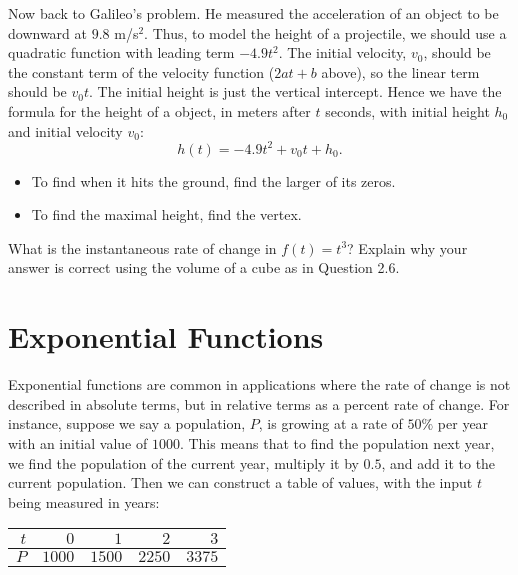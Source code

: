 \begin{eg} Now back to Galileo's problem. He measured the acceleration of an object to be downward at $9.8$ m/s$^2$. Thus, to model the height of a projectile, we should use a quadratic function with leading term $-4.9t^2$. The initial velocity, $v_0$, should be the constant term of the velocity function ($2at+b$ above), so the linear term should be $v_0 t$. The initial height is just the vertical intercept. Hence we have the formula for the height of a object, in meters after $t$ seconds, with initial height $h_0$ and initial velocity $v_0$:
\[
h(t) = -4.9t^2 + v_0t + h_0.
\]
\begin{itemize}
\item To find when it hits the ground, find the larger of its zeros.
\item To find the maximal height, find the vertex.
\end{itemize}

\begin{question} What is the instantaneous rate of change in $f(t) = t^3$? Explain why your answer is correct using the volume of a cube as in Question 2.6. 
\end{question}

\vfill

\section{Exponential Functions}

Exponential functions are common in applications where the rate of change is not described in absolute terms, but in relative terms as a percent rate of change. For instance, suppose we say a population, $P$, is growing at a rate of $50\%$ per year with an initial value of $1000$. This means that to find the population next year, we find the population of the current year, multiply it by $0.5$, and add it to the current population. Then we can construct a table of values, with the input $t$ being measured in years:\\

\vspace{.2in}
\begin{center}
\begin{tabular}{|r || r | r | r | r |}
\hline $t$ & $0$ & $1$ & $2$ & $3$\\
\hline $P$ & $1000$ & $1500$ & $2250$ & $3375$\\
\hline
\end{tabular} 
\end{center}



\end{eg}
